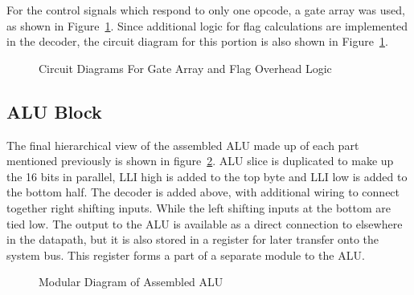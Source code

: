 For the control signals which respond to only one opcode, a gate array was used, as shown in Figure~\ref{fig:GateArray}. Since additional logic for flag calculations are implemented in the decoder, the circuit diagram for this portion is also shown in Figure~\ref{fig:GateArray}. 

\begin{figure}[h]
	\caption{Circuit Diagrams For Gate Array and Flag Overhead Logic}
	\label{fig:GateArray}
\end{figure}

\subsection{ALU Block}
The final hierarchical view of the assembled ALU made up of each part mentioned previously is shown in figure~\ref{fig:ALUAssembled}. ALU slice is duplicated to make up the 16 bits in parallel, LLI high is added to the top byte and LLI low is added to the bottom half. The decoder is added above, with additional wiring to connect together right shifting inputs. While the left shifting inputs at the bottom are tied low. The output to the ALU is available as a direct connection to elsewhere in the datapath, but it is also stored in a register for later transfer onto the system bus. This register forms a part of a separate module to the ALU. 

\begin{figure}[h]
	\caption{Modular Diagram of Assembled ALU}
	\label{fig:ALUAssembled}
\end{figure}

